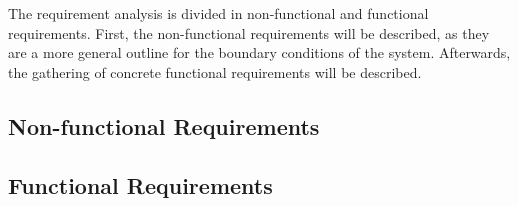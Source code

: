 The requirement analysis is divided in non-functional and functional requirements.
First, the non-functional requirements will be described, as they are a more general outline for the boundary conditions of the system.
Afterwards, the gathering of concrete functional requirements will be described.

\subsection{\label{sec::Non-functionalRequirements}Non-functional Requirements}

\subsection{\label{sec::FunctionalRequirements}Functional Requirements}
